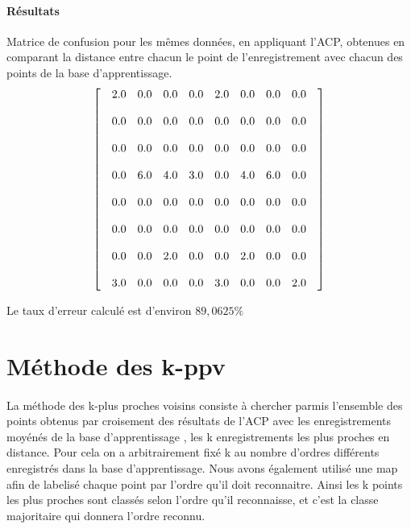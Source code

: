 \documentclass[a4paper,12pt]{report}
\begin{document}
\paragraph{Résultats}
 Matrice de confusion pour les mêmes données, en appliquant l'ACP, obtenues en comparant la distance entre chacun le point de l'enregistrement avec chacun des points de la base d'apprentissage.
\[
\begin{bmatrix}
  & 2.0 & 0.0 & 0.0 & 0.0  & 2.0 & 0.0 & 0.0 & 0.0 &  \cr \\
  & 0.0 & 0.0 & 0.0 & 0.0  & 0.0 & 0.0 & 0.0 & 0.0 &  \cr \\
  & 0.0 & 0.0 & 0.0 & 0.0  & 0.0 & 0.0 & 0.0 & 0.0 &  \cr \\
  & 0.0 & 6.0 & 4.0 & 3.0  & 0.0 & 4.0 & 6.0 & 0.0 &  \cr \\
  & 0.0 & 0.0 & 0.0 & 0.0  & 0.0 & 0.0 & 0.0 & 0.0 &  \cr \\
  & 0.0 & 0.0 & 0.0 & 0.0  & 0.0 & 0.0 & 0.0 & 0.0 &  \cr \\
  & 0.0 & 0.0 & 2.0 & 0.0  & 0.0 & 2.0 & 0.0 & 0.0 &  \cr \\
  & 3.0 & 0.0 & 0.0 & 0.0  & 3.0 & 0.0 & 0.0 & 2.0 &   
\end{bmatrix}
\]

Le taux d'erreur calculé est d'environ $89,0625\%$\\
\newpage
\section{Méthode des k-ppv}
\paragraph{}
La méthode des k-plus proches voisins consiste à chercher parmis l'ensemble des points obtenus par croisement des résultats de l'ACP avec les enregistrements moyénés de la base d'apprentissage , les k enregistrements les plus proches en distance. Pour cela on a arbitrairement fixé k au nombre d'ordres différents enregistrés dans la base d'apprentissage. Nous avons également utilisé une map afin de labelisé chaque point par l'ordre qu'il doit reconnaitre.  Ainsi les k points les plus proches sont classés selon l'ordre qu'il reconnaisse, et c'est la classe majoritaire qui donnera l'ordre reconnu.
\end{document}
